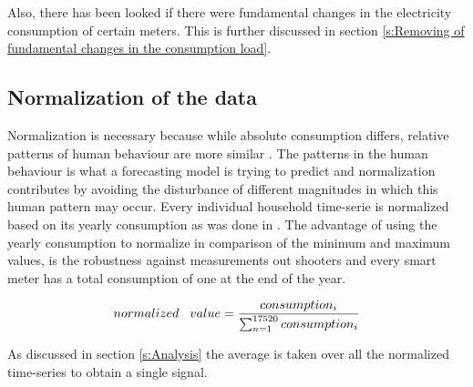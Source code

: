 

Also, there has been looked if there were fundamental changes in the electricity consumption of certain meters. This is further discussed in section \ref{s:Removing of fundamental changes in the consumption load}.


\subsection{Normalization of the data}
Normalization is necessary because while absolute consumption differs, relative patterns of human behaviour are more similar \cite{Lago2020}. The patterns in the human behaviour is what a forecasting model is trying to predict and normalization contributes by avoiding the disturbance of different magnitudes in which this human pattern may occur. Every individual household time-serie is normalized based on its yearly consumption as was done in \cite{Lago2020}. The advantage of using the yearly consumption to normalize in comparison of the minimum and maximum values, is the robustness against measurements out shooters and every smart meter has a total consumption of one at the end of the year.

\begin{equation}\label{eq:norm}
	normalized\hspace{0.3cm} value = \frac{consumption_i}{\sum_{n=1}^{17520} consumption_i}
\end{equation} 

As discussed in section \ref{s:Analysis} the average is taken over all the normalized time-series to obtain a single signal.  


